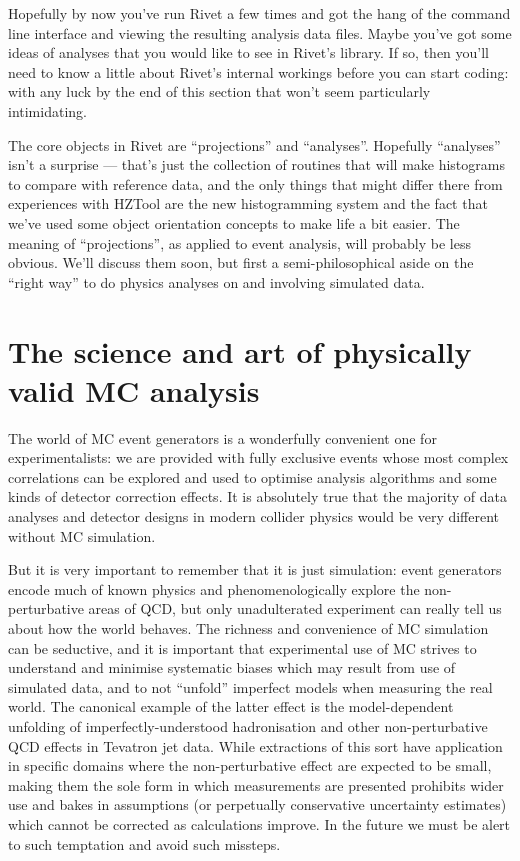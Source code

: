 Hopefully by now you've run Rivet a few times and got the hang of the command
line interface and viewing the resulting analysis data files. Maybe you've got
some ideas of analyses that you would like to see in Rivet's library. If so,
then you'll need to know a little about Rivet's internal workings before you can
start coding: with any luck by the end of this section that won't seem
particularly intimidating.

The core objects in Rivet are ``projections'' and ``analyses''. Hopefully
``analyses'' isn't a surprise --- that's just the collection of routines that
will make histograms to compare with reference data, and the only things that
might differ there from experiences with HZTool\cite{Bromley:1995np} are the new histogramming system
and the fact that we've used some object orientation concepts to make life a bit
easier. The meaning of ``projections'', as applied to event analysis, will
probably be less obvious. We'll discuss them soon, but first a
semi-philosophical aside on the ``right way'' to do physics analyses on and
involving simulated data.


\section{The science and art of physically valid MC analysis}

The world of MC event generators is a wonderfully convenient one for
experimentalists: we are provided with fully exclusive events whose most complex
correlations can be explored and used to optimise analysis algorithms and some
kinds of detector correction effects. It is absolutely true that the majority of
data analyses and detector designs in modern collider physics would be very
different without MC simulation.

But it is very important to remember that it is just simulation: event
generators encode much of known physics and phenomenologically explore the
non-perturbative areas of QCD, but only unadulterated experiment can really tell
us about how the world behaves. The richness and convenience of MC simulation
can be seductive, and it is important that experimental use of MC strives to
understand and minimise systematic biases which may result from use of simulated
data, and to not ``unfold'' imperfect models when measuring the real world. The
canonical example of the latter effect is the model-dependent unfolding of
imperfectly-understood hadronisation and other non-perturbative QCD effects in
Tevatron jet data. While extractions of this sort have application in specific
domains where the non-perturbative effect are expected to be small, making them
the sole form in which measurements are presented prohibits wider use and bakes
in assumptions (or perpetually conservative uncertainty estimates) which cannot
be corrected as calculations improve. In the future we must be alert to such
temptation and avoid such missteps.

